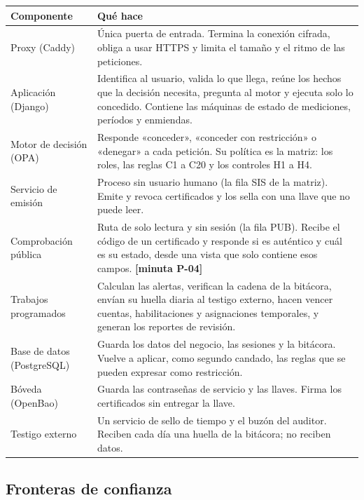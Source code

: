 \documentclass[11pt,letterpaper]{article}
\newcommand{\cab}[1]{\textbf{\rmfamily #1}}
\newcommand{\resp}[1]{\textrm{\footnotesize\bfseries [minuta #1]}}
\begin{document}
\begin{center}
\small
\renewcommand{\arraystretch}{1.13}
\begin{tabularx}{\textwidth}{@{}L{3.3cm} Y@{}}
\toprule
\cab{Componente} & \cab{Qué hace} \\
\midrule
Proxy (Caddy) & Única puerta de entrada. Termina la conexión cifrada, obliga a usar HTTPS y limita el tamaño y el ritmo de las peticiones. \\
Aplicación (Django) & Identifica al usuario, valida lo que llega, reúne los hechos que la decisión necesita, pregunta al motor y ejecuta solo lo concedido. Contiene las máquinas de estado de mediciones, períodos y enmiendas. \\
Motor de decisión (OPA) & Responde «conceder», «conceder con restricción» o «denegar» a cada petición. Su política es la matriz: los roles, las reglas C1 a C20 y los controles H1 a H4. \\
Servicio de emisión & Proceso sin usuario humano (la fila SIS de la matriz). Emite y revoca certificados y los sella con una llave que no puede leer. \\
Comprobación pública & Ruta de solo lectura y sin sesión (la fila PUB). Recibe el código de un certificado y responde si es auténtico y cuál es su estado, desde una vista que solo contiene esos campos. \resp{P-04} \\
Trabajos programados & Calculan las alertas, verifican la cadena de la bitácora, envían su huella diaria al testigo externo, hacen vencer cuentas, habilitaciones y asignaciones temporales, y generan los reportes de revisión. \\
Base de datos (PostgreSQL) & Guarda los datos del negocio, las sesiones y la bitácora. Vuelve a aplicar, como segundo candado, las reglas que se pueden expresar como restricción. \\
Bóveda (OpenBao) & Guarda las contraseñas de servicio y las llaves. Firma los certificados sin entregar la llave. \\
Testigo externo & Un servicio de sello de tiempo y el buzón del auditor. Reciben cada día una huella de la bitácora; no reciben datos. \\
\bottomrule
\end{tabularx}
\end{center}

\subsection{Fronteras de confianza}
\end{document}

